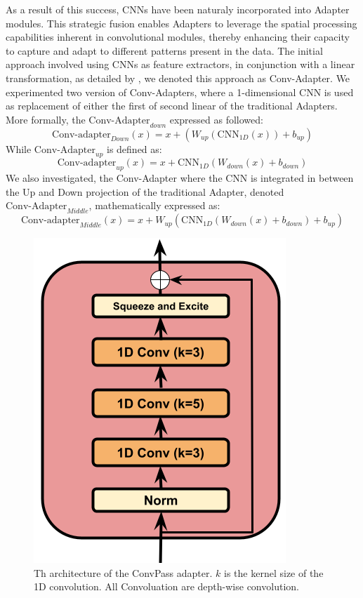 As a result of this success, CNNs have been naturaly incorporated into Adapter modules. This strategic fusion enables Adapters to leverage the spatial processing capabilities inherent in convolutional modules, thereby enhancing their capacity to capture and adapt to different patterns present in the data. The initial approach involved using CNNs as feature extractors, in conjunction with a linear transformation, as detailed by \cite{yang23p_interspeech}, we denoted this approach as Conv-Adapter. We experimented two version of Conv-Adapters, where a 1-dimensional CNN is used as replacement of either the first of second linear of the traditional Adapters. More formally, the \textit{$\text{Conv-Adapter}_{down}$} expressed as followed:
\begin{equation}
    \text{Conv-adapter}_{Down}(x) = x + (W_{up}(\text{CNN}_{1D}(x))+ b_{up})
\end{equation}
While \textit{$\text{Conv-Adapter}_{up}$} is defined as:
\begin{equation}
    \text{Conv-adapter}_{up}(x) = x + \text{CNN}_{1D}(W_{down}(x)+ b_{down})
\end{equation}
We also investigated, the \cite{muthuchamyselvaraj23_interspeech} Conv-Adapter where the CNN is integrated in between the Up and Down projection of the traditional Adapter, denoted \textit{$\text{Conv-Adapter}_{Middle}$}, mathematically expressed as:
\begin{equation}
    \text{Conv-adapter}_{Middle}(x) = x + W_{up}(\text{CNN}_{1D}(W_{down}(x)+ b_{down})+ b_{up})
\end{equation}

\begin{figure}
    \begin{center}
        \includegraphics[scale=0.4]{imgs/ConvPass.png}
        \caption{Th architecture of the ConvPass adapter. $k$ is the kernel size of the 1D convolution. All Convoluation are depth-wise convolution.}
        \label{fig:convpass}
    \end{center}
\end{figure}

